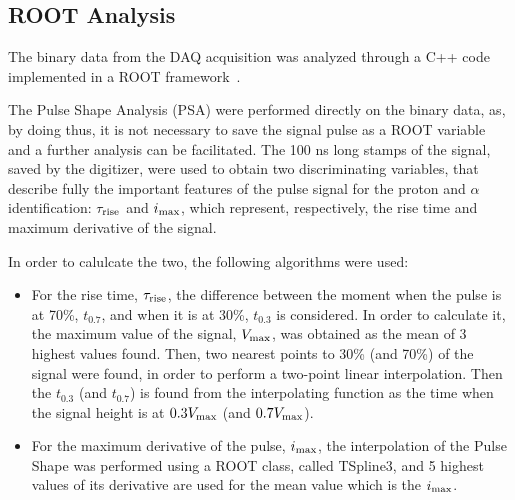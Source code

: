 \subsection{ROOT Analysis}

The binary data from the DAQ acquisition was analyzed through a C++ code
implemented in a ROOT framework~\cite{root}.

\bigbreak

The Pulse Shape Analysis (PSA) were performed directly on the binary data, as,
by doing thus, it is not necessary to save the signal pulse as a ROOT variable
and a further analysis can be facilitated. The \num{100} ns long stamps of the
signal, saved by the digitizer, were used to obtain two discriminating
variables, that describe fully the important features of the pulse signal for
the proton and $\alpha$ identification: $\tau _{\textup{rise}}$ and
$i_{\textup{max}}$, which represent, respectively, the rise time and maximum
derivative of the signal.

\bigbreak

In order to calulcate the two, the following algorithms were used:

\begin{itemize}

\item For the rise time, $\tau _{\textup{rise}}$, the difference between the moment when the pulse is at
  70\%, $t_{0.7}$, and when it is at 30\%, $t_{0.3}$ is considered.
  In order to calculate it, the maximum value of the signal, $V_{\textup{max}}$,
  was obtained as the mean of 3 highest values found. Then, two nearest points
  to 30\% (and 70\%) of the signal were found, in order to perform a two-point
  linear interpolation. Then the $t_{0.3}$ (and $t_{0.7}$) is found from the
  interpolating function as the time when the signal height is at
  $0.3 V_{\textup{max}}$
  (and $0.7 V_{\textup{max}}$).
\item For the maximum derivative of the pulse, $i_{\textup{max}}$, 
  the interpolation of the Pulse Shape was performed using a ROOT class,
  called TSpline3, and 5 highest values of its derivative are used for the
  mean value which is the $i_{\textup{max}}$.

\end{itemize}

